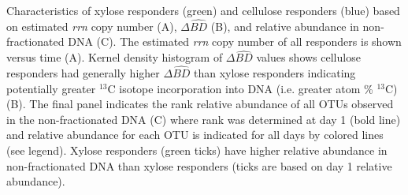 Characteristics of xylose responders (green) and cellulose responders (blue)
based on estimated \textit{rrn} copy number (A), $\Delta\hat{BD}$ (B), and
relative abundance in non-fractionated DNA (C). The estimated \textit{rrn} copy
number of all responders is shown versus time (A). Kernel density histogram of
$\Delta\hat{BD}$ values shows cellulose responders had generally higher
$\Delta\hat{BD}$ than xylose responders indicating potentially greater $^{13}$C
isotope incorporation into DNA (i.e. greater atom \% $^{13}$C) (B). The final
panel indicates the rank relative abundance of all OTUs observed in the
non-fractionated DNA (C) where rank was determined at day 1 (bold line) and
relative abundance for each OTU is indicated for all days by colored lines (see
legend). Xylose responders (green ticks) have higher relative abundance in
non-fractionated DNA than xylose responders (ticks are based on day 1 relative
abundance).
